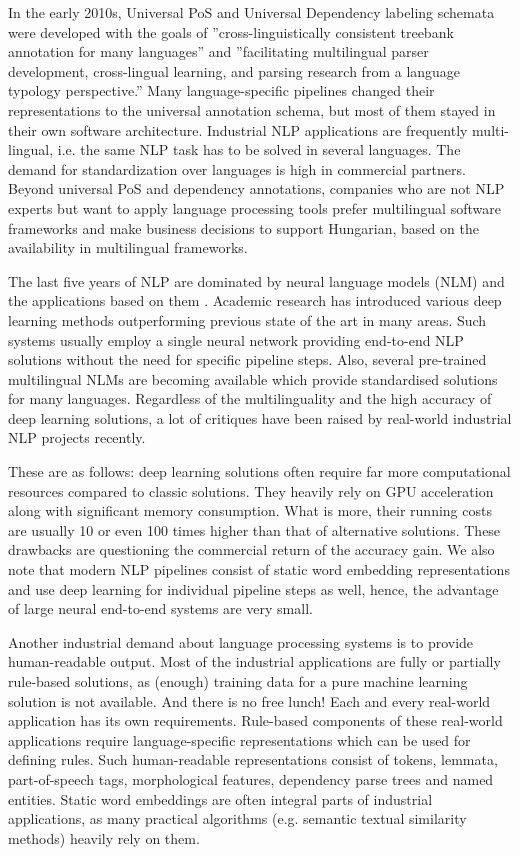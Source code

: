 \documentclass{llncs}
\begin{document}
In the early 2010s, Universal PoS \citep{udpos} and Universal Dependency \citep{univedepv1} labeling schemata were developed with the goals of ''cross-linguistically consistent treebank annotation for many languages'' and ''facilitating multilingual parser development, cross-lingual learning, and parsing research from a language typology perspective.'' Many language-specific pipelines changed their representations to the universal annotation schema, but most of them stayed in their own software architecture. Industrial NLP applications are frequently multi-lingual, i.e. the same NLP task has to be solved in several languages. The demand for standardization over languages is high in commercial partners. Beyond universal PoS and dependency annotations, companies who are not NLP experts but want to apply language processing tools prefer multilingual software frameworks and make business decisions to support Hungarian, based on the availability in multilingual frameworks.

The last five years of NLP are dominated by neural language models (NLM) and the applications based on them \citep{nlp-trends}. Academic research has introduced various deep learning methods outperforming previous state of the art in many areas. Such systems usually employ a single neural network providing end-to-end NLP solutions without the need for specific pipeline steps. Also, several pre-trained multilingual NLMs are becoming available which provide standardised solutions for many languages. Regardless of the multilinguality and the high accuracy of deep learning solutions, a lot of critiques have been raised by real-world industrial NLP projects recently.

These are as follows: deep learning solutions often require far more computational resources compared to classic solutions. They heavily rely on GPU acceleration along with significant memory consumption. What is more, their running costs are usually 10 or even 100 times higher than that of alternative solutions. These drawbacks are questioning the commercial return of the accuracy gain. We also note that modern NLP pipelines consist of static word embedding representations and use deep learning for individual pipeline steps as well, hence, the advantage of large neural end-to-end systems
are very small.

Another industrial demand about language processing systems is to provide human-readable output. Most of the industrial applications are fully or partially rule-based solutions, as (enough) training data for a pure machine learning solution is not available. And there is no free lunch! Each and every real-world application has its own requirements. Rule-based components of these real-world applications require language-specific representations which can be used for defining rules. Such human-readable representations consist of tokens, lemmata, part-of-speech tags, morphological features, dependency parse trees and named entities. Static word embeddings are often integral parts of industrial applications, as many practical algorithms (e.g. semantic textual similarity methods) heavily rely on them.
\end{document}
